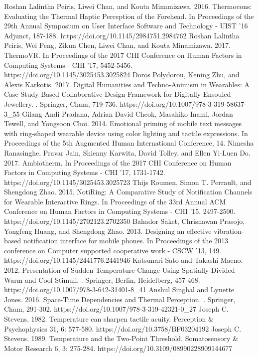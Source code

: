 \documentclass[preprint,12pt]{elsarticle}
\begin{document}
\begin{thebibliography}{00}
Roshan Lalintha Peiris, Liwei Chan, and Kouta Minamizawa. 2016. Thermocons: Evaluating the Thermal Haptic Perception of the Forehead. In Proceedings of the 29th Annual Symposium on User Interface Software and Technology - UIST '16 Adjunct, 187-188. https://doi.org/10.1145/2984751.2984762
Roshan Lalintha Peiris, Wei Peng, Zikun Chen, Liwei Chan, and Kouta Minamizawa. 2017. ThermoVR. In Proceedings of the 2017 CHI Conference on Human Factors in Computing Systems - CHI '17, 5452-5456. https://doi.org/10.1145/3025453.3025824
Doros Polydorou, Kening Zhu, and Alexis Karkotis. 2017. Digital Humanities and Techno-Animism in Wearables: A Case-Study-Based Collaborative Design Framework for Digitally-Ensouled Jewellery. . Springer, Cham, 719-736. https://doi.org/10.1007/978-3-319-58637-3\_55
Gilang Andi Pradana, Adrian David Cheok, Masahiko Inami, Jordan Tewell, and Yongsoon Choi. 2014. Emotional priming of mobile text messages with ring-shaped wearable device using color lighting and tactile expressions. In Proceedings of the 5th Augmented Human International Conference, 14.
Nimesha Ranasinghe, Pravar Jain, Shienny Karwita, David Tolley, and Ellen Yi-Luen Do. 2017. Ambiotherm. In Proceedings of the 2017 CHI Conference on Human Factors in Computing Systems - CHI '17, 1731-1742. https://doi.org/10.1145/3025453.3025723
Thijs Roumen, Simon T. Perrault, and Shengdong Zhao. 2015. NotiRing: A Comparative Study of Notification Channels for Wearable Interactive Rings. In Proceedings of the 33rd Annual ACM Conference on Human Factors in Computing Systems - CHI '15, 2497-2500. https://doi.org/10.1145/2702123.2702350
Bahador Saket, Chrisnawan Prasojo, Yongfeng Huang, and Shengdong Zhao. 2013. Designing an effective vibration-based notification interface for mobile phones. In Proceedings of the 2013 conference on Computer supported cooperative work - CSCW '13, 149. https://doi.org/10.1145/2441776.2441946
Katsunari Sato and Takashi Maeno. 2012. Presentation of Sudden Temperature Change Using Spatially Divided Warm and Cool Stimuli. . Springer, Berlin, Heidelberg, 457-468. https://doi.org/10.1007/978-3-642-31401-8\_41
Anshul Singhal and Lynette Jones. 2016. Space-Time Dependencies and Thermal Perception. . Springer, Cham, 291-302. https://doi.org/10.1007/978-3-319-42321-0\_27
Joseph C. Stevens. 1982. Temperature can sharpen tactile acuity. Perception \& Psychophysics 31, 6: 577-580. https://doi.org/10.3758/BF03204192
Joseph C. Stevens. 1989. Temperature and the Two-Point Threshold. Somatosensory \& Motor Research 6, 3: 275-284. https://doi.org/10.3109/08990228909144677

\end{thebibliography}
\end{document}
